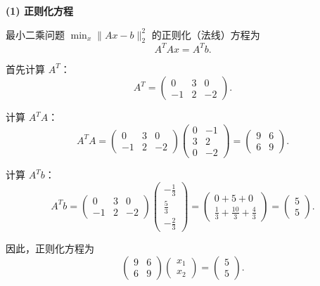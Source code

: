 \documentclass{article}
\begin{document}
\begin{solution}

  \textbf{(1) 正则化方程}

  最小二乘问题 $\min_x \|Ax - b\|_2^2$ 的正则化（法线）方程为
  \[
    A^T A x = A^T b.
  \]

  首先计算 $A^T$：
  \[
    A^T =
    \begin{pmatrix} 0 & 3 & 0 \\ -1 & 2 & -2
    \end{pmatrix}.
  \]

  计算 $A^T A$：
  \[
    A^T A =
    \begin{pmatrix} 0 & 3 & 0 \\ -1 & 2 & -2
    \end{pmatrix}
    \begin{pmatrix} 0 & -1 \\ 3 & 2 \\ 0 & -2
    \end{pmatrix}
    =
    \begin{pmatrix} 9 & 6 \\ 6 & 9
    \end{pmatrix}.
  \]

  计算 $A^T b$：
  \[
    A^T b =
    \begin{pmatrix} 0 & 3 & 0 \\ -1 & 2 & -2
    \end{pmatrix}
    \begin{pmatrix} -\frac{1}{3} \\ \frac{5}{3} \\ -\frac{2}{3}
    \end{pmatrix}
    =
    \begin{pmatrix} 0 + 5 + 0 \\ \frac{1}{3} + \frac{10}{3} + \frac{4}{3}
    \end{pmatrix}
    =
    \begin{pmatrix} 5 \\ 5
    \end{pmatrix}.
  \]

  因此，正则化方程为
  \[
    \begin{pmatrix} 9 & 6 \\ 6 & 9
    \end{pmatrix}
    \begin{pmatrix} x_1 \\ x_2
    \end{pmatrix}
    =
    \begin{pmatrix} 5 \\ 5
    \end{pmatrix}.
  \]


\end{solution}
\end{document}
